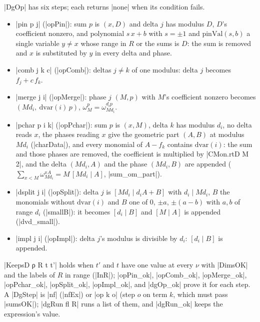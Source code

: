 \begin{definition}\label{def:lean-sym-dgop}
\lean|DgOp| has six steps; each returns \lean|none| when its condition fails.
\begin{itemize}
\item \lean|pin p j| (\lean|opPin|): sum $p$ is $(x,D)$ and delta $j$ has modulus $D$, $D$'s coefficient nonzero, and polynomial $s\,x+b$ with $s=\pm1$ and $\mathrm{pinVal}(s,b)$ a single variable $y\ne x$ whose range in $R$ or the sums is $D$: the sum is removed and $x$ is substituted by $y$ in every delta and phase.
\item \lean|comb j k c| (\lean|opComb|): deltas $j\ne k$ of one modulus: delta $j$ becomes $f_j+c\,f_k$.
\item \lean|merge j i| (\lean|opMerge|): phase $j$ $(M,p)$ with $M$'s coefficient nonzero becomes $(M d_i,\ \mathrm{dvar}(i)\,p)$, $\omega_M^p=\omega_{Md_i}^{d_ip}$.
\item \lean|pchar p i k| (\lean|opPchar|): sum $p$ is $(x,M)$, delta $k$ has modulus $d_i$, no delta reads $x$, the phases reading $x$ give the geometric part $(A,B)$ at modulus $Md_i$ (\lean|charData|), and every monomial of $A-f_k$ contains $\mathrm{dvar}(i)$: the sum and those phases are removed, the coefficient is multiplied by \lean|CMon.rtD M 2|, and the delta $(Md_i,A)$ and the phase $(Md_i,B)$ are appended ($\sum_{x<M}\omega_{Md_i}^{xA}=M\,[Md_i\mid A]$, \lean|sum_om_part|).
\item \lean|dsplit j i| (\lean|opSplit|): delta $j$ is $[Md_i\mid d_iA+B]$ with $d_i\mid Md_i$, $B$ the monomials without $\mathrm{dvar}(i)$ and $B$ one of $0$, $\pm a$, $\pm(a-b)$ with $a,b$ of range $d_i$ (\lean|smallB|): it becomes $[d_i\mid B]$ and $[M\mid A]$ is appended (\lean|dvd_small|).
\item \lean|impl j i| (\lean|opImpl|): delta $j$'s modulus is divisible by $d_i$: $[d_i\mid B]$ is appended.
\end{itemize}
\lean|KeepsD ρ R t t'| holds when $t'$ and $t$ have one value at every $\nu$ with \lean|DimsOK| and the labels of $R$ in range (\lean|InR|); \lean|opPin_ok|, \lean|opComb_ok|, \lean|opMerge_ok|, \lean|opPchar_ok|, \lean|opSplit_ok|, \lean|opImpl_ok|, and \lean|dgOp_ok| prove it for each step. A \lean|DgStep| is \lean|nf| (\lean|nfEx|) or \lean|op k o| (step $o$ on term $k$, which must pass \lean|sumsOK|); \lean|dgRun fl R| runs a list of them, and \lean|dgRun_ok| keeps the expression's value.
\end{definition}


